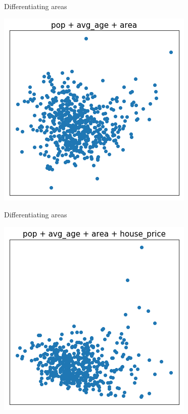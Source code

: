 \documentclass{beamer}
\begin{document}
\begin{frame}{Differentiating areas}
  \begin{center}
    \includegraphics[scale=.40]{../gfx/cluster1.png}
  \end{center}
\end{frame}

\begin{frame}{Differentiating areas}
  \begin{center}
    \includegraphics[scale=.40]{../gfx/cluster2.png}
  \end{center}
\end{frame}
\end{document}

